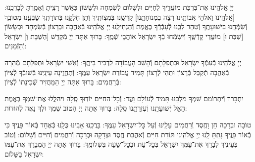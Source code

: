 \documentclass[twoside, openany, parskip=half, 11pt]{book}
\begin{document}
יְיָ אֱלֹהֵֽינוּ אֶת־בִּרְכַּת מוֹעֲדֶֽיךָ לְֿחַיִּים וּלְשָׁלוֹם לְֿשִׂמְחָה וּלְשָׂשׂוֹן כַּאֲשֶׁר רָצִֽיתָ וְֿאָמַֽרְתָּ לְֿבָרֲכֵֽנוּ: [\shabbos אֱלֹהֵֽינוּ וֵאלֹהֵי אֲבוֹתֵֽינוּ רְֿצֵה בִמְנוּחָתֵֽנוּ] קַדְּֿשֵֽׁנוּ בְּֿמִצְוֹתֶֽיךָ וְֿתֵן חֶלְקֵֽנוּ בְּֿתוֹרָתֶֽךָ שַׂבְּֿעֵֽנוּ מִטּוּבֶֽךָ וְֿשַׂמְּֿחֵֽנוּ בִּישׁוּעָתֶֽךָ וְֿטַהֵר לִבֵּֽנוּ לְֿעָבְֿדְּֿךָ בֶּאֱמֶת וְֿהַנְחִילֵֽנוּ יְיָ אֱלֹהֵֽינוּ בְּֿאַהֲבָה וּבְרָצוֹן בְּֿשִׂמְחָה וּבְשָׂשׂוֹן [\shabbos שַׁבַּת וּ] מוֹעֲדֵי קָדְֿשֶֽׁךָ וְֿיִשְׂמְֿחוּ בְֿךָ יִשְׂרָאֵל אוֹהֲבֵי שְֿׁמֶֽךָ: בָּרוּךְ אַתָּה יְיָ מְֿקַדֵּשׁ
[\shabbos הַשַּׁבָּת וְ] יִשְׂרָאֵל וְֿהַזְּֿמַנִּים:


יְיָ אֱלֹהֵֽינוּ בְּֿעַמְּֿךָ יִשְׂרָאֵל וּבִתְפִלָּתָם וְֿהָשֵׁב הָעֲבוֹדָה לִדְבִיר בֵּיתֶֽךָ: וְֿאִשֵּׁי יִשְׂרָאֵל וּתְפִלָּתָם מְֿהֵרָה בְּֿאַהֲבָה תְֿקַבֵּל בְּֿרָצוֹן וּתְהִי לְֿרָצוֹן תָּמִיד עֲבוֹדַת יִשְׂרָאֵל עַמֶּֽךָ: וְֿתֶחֱזֶֽינָה עֵינֵֽינוּ בְּֿשׁוּבְֿךָ לְֿצִיּוֹן בְּֿרַחֲמִים: בָּרוּךְ אַתָּה יְיָ הַמַּחֲזִיר שְֿׁכִינָתוֹ לְֿצִיּוֹן:

\modim


\clearpage

\vspace{-\baselineskip}
יִתְבָּרַךְ וְֿיִתְרוֹמַם שִׁמְךָ מַלְכֵּֽנוּ תָּמִיד לְֿעוֹלָם וָעֶד: וְֿכׇל־הַחַיִּים יוֹדֽוּךָ סֶּֽלָה וִיהַלֲלוּ אֶת־שִׁמְךָ בֶּאֱמֶת הָאֵל יְֿשׁוּעָתֵֽנוּ וְֿעֶזְרָתֵֽנוּ סֶֽלָה: בָּרוּךְ אַתָּה יְיָ הַטּוֹב שִׁמְךָ וּלְךָ נָאֶה לְֿהוֹדוֹת:



טוֹבָה וּבְרָכָה חֵן וָחֶֽסֶד וְֿרַחֲמִים עָלֵֽינוּ וְֿעַל כׇּל־יִשְׂרָאֵל עַמֶּֽךָ: בָּרֲכֵֽנוּ אָבִֽינוּ כֻּלָּֽנוּ כְּֿאֶחָד בְּֿאוֹר פָּנֶֽיךָ כִּי בְֿאוֹר פָּנֶֽיךָ נָתַֽתָּ לָֽנוּ יְיָ אֱלֹהֵֽינוּ תּוֹרַת חַיִּים וְֿאַהֲבַת חֶֽסֶד וּצְדָקָה וּבְרָכָה וְֿרַחֲמִים וְֿחַיִּים וְֿשָׁלוֹם: וְֿטוֹב בְּֿעֵינֶֽיךָ לְֿבָרֵךְ אֶת־עַמְּֿךָ יִשְׂרָאֵל בְּֿכׇל־עֵת וּבְכׇל־שָׁעָה בִּשְׁלוֹמֶֽךָ: בָּרוּךְ אַתָּה יְיָ הַמְֿבָרֵךְ אֶת־עַמּוֹ יִשְׂרָאֵל בַּשָּׁלוֹם:

\tachanunim

\vfill


\\

\sepline
\end{document}
